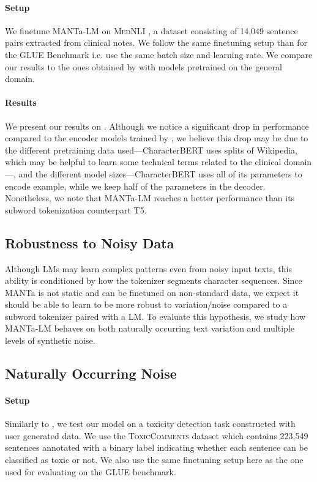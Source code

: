 \paragraph{Setup} We finetune MANTa-LM on \textsc{MedNLI} \citep{romanov-shivade-2018-lessons}, a dataset consisting of 14,049 sentence pairs extracted from clinical notes. We follow the same finetuning setup than for the GLUE Benchmark i.e. use the same batch size and learning rate. We compare our results to the ones obtained by \citet{el-boukkouri-etal-2020-characterbert} with models pretrained on the general domain.

\paragraph{Results} We present our results on . Although we notice a significant drop in performance compared to the encoder models trained by \citet{el-boukkouri-etal-2020-characterbert}, we believe this drop may be due to the different pretraining data used---CharacterBERT uses splits of Wikipedia, which may be helpful to learn some technical terms related to the clinical domain---, and the different model sizes---CharacterBERT uses all of its parameters to encode example, while we keep half of the parameters in the decoder. Nonetheless, we note that MANTa-LM reaches a better performance than its subword tokenization counterpart T5.

\subsection{Robustness to Noisy Data}
Although LMs may learn complex patterns even from noisy input texts, this ability is conditioned by how the tokenizer segments character sequences. Since MANTa is not static and can be finetuned on non-standard data, we expect it should be able to learn to be more robust to variation/noise compared to a subword tokenizer paired with a LM. To evaluate this hypothesis, we study how MANTa-LM behaves on both naturally occurring text variation and multiple levels of synthetic noise.

\subsection{Naturally Occurring Noise}
\paragraph{Setup} Similarly to \citet{tay2021charformer}, we test our model on a toxicity detection task constructed with user generated data. We use the \textsc{ToxicComments}{} dataset \citep{wulczyn2017ex} which contains 223,549 sentences annotated with a binary label indicating whether each sentence can be classified as toxic or not. We also use the same finetuning setup here as the one used for evaluating on the GLUE benchmark. 

